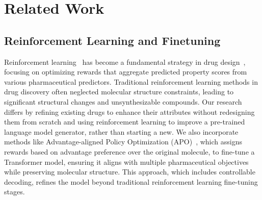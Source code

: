 \section{Related Work}\label{sec:related}





































\subsection{Reinforcement Learning and Finetuning}





Reinforcement learning~\citep{tan2022reinforcement}  has become a fundamental strategy in drug design~\citep{born2021paccmannrl, guimaraes2017objective, neil2018exploring, olivecrona2017molecular, popova2018deep,  staahl2019deep, tan2022drlinker, wang2022reinforcement, zhang2023universal, zhou2019optimization}, focusing on optimizing rewards that aggregate predicted property scores from various pharmaceutical predictors. Traditional reinforcement learning methods in drug discovery often neglected molecular structure constraints, leading to significant structural changes and unsynthesizable compounds. Our research differs by refining existing drugs to enhance their attributes without redesigning them from scratch and using reinforcement learning to improve a pre-trained language model generator, rather than starting a new. We also incorporate methods like Advantage-aligned Policy Optimization (APO)~\citep{liu2023drugimprover}, which assigns rewards based on advantage preference over the original molecule, to fine-tune a Transformer model, ensuring it aligns with multiple pharmaceutical objectives while preserving molecular structure. This approach, which includes controllable decoding, refines the model beyond traditional reinforcement learning fine-tuning stages.

























